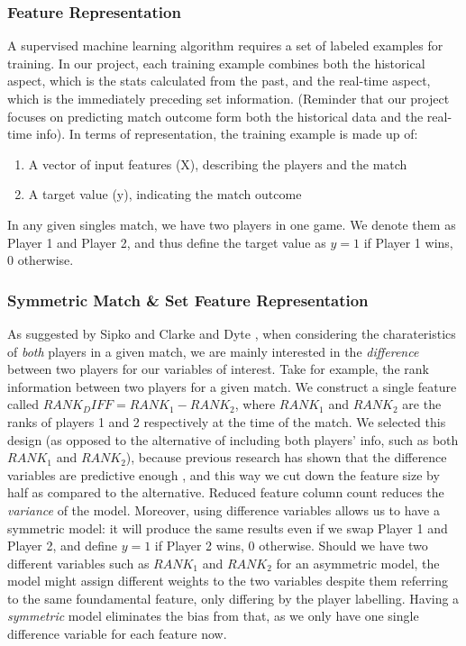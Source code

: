 \documentclass[paper=a4, fontsize=11pt]{scrartcl} %
\numberwithin{equation}{section} %
\numberwithin{figure}{section} %
\numberwithin{table}{section} %
\begin{document}
\subsubsection{Feature Representation}
A supervised machine learning algorithm requires a set of labeled examples for training. In our project, each training example combines both the historical aspect, which is the stats calculated from the past, and the real-time aspect, which is the immediately preceding set information. (Reminder that our project focuses on predicting match outcome form both the historical data and the real-time info). In terms of representation, the training example is made up of:
\begin{enumerate}
\item A vector of input features (X), describing the players and the match
\item A target value (y), indicating the match outcome
\end{enumerate}
In any given singles match, we have two players in one game. We denote them as Player 1 and Player 2, and thus define the target value as 
$y = 1$ if Player 1 wins, 0 otherwise.
\subsubsection{Symmetric Match \& Set Feature Representation}
As suggested by Sipko \cite{tennis1} and Clarke and Dyte \cite{Clarke2010}, when considering the charateristics of \textit{both} players in a given match, we are mainly interested in the \textit{difference} between two players for our variables of interest. Take for example, the rank information between two players for a given match. We construct a single feature called $RANK_DIFF = RANK_1 - RANK_2$, where $RANK_1$ and $RANK_2$ are the ranks of players 1 and 2 respectively at the time of the match. We selected this design (as opposed to the alternative of including both players' info, such as both $RANK_1$ and $RANK_2$), because previous research has shown that the difference variables are predictive enough \cite{tennis1} \cite{omalley}, and this way we cut down the feature size by half as compared to the alternative. Reduced feature column count reduces the \textit{variance} of the model. Moreover, using difference variables allows us to have a symmetric model: it will produce the same results even if we swap Player 1 and Player 2, and define $y = 1$ if Player 2 wins, 0 otherwise. Should we have two different variables such as $RANK_1$ and $RANK_2$ for an asymmetric model, the model might assign different weights to the two variables despite them referring to the same foundamental feature, only differing by the player labelling. Having a \textit{symmetric} model eliminates the bias from that, as we only have one single difference variable for each feature now. 
\end{document}
